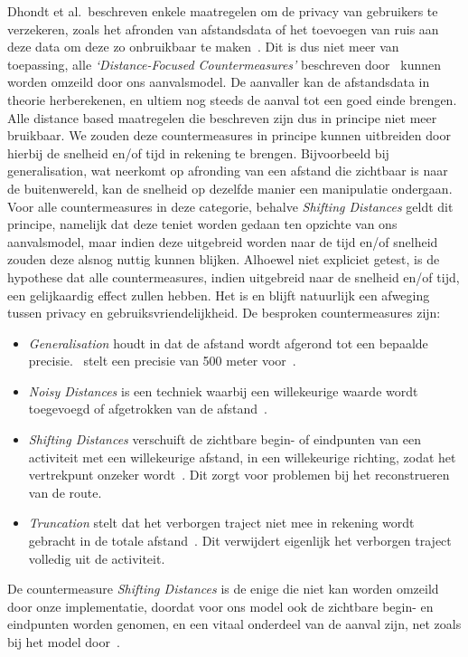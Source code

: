 Dhondt et al.\ beschreven enkele maatregelen om de privacy van gebruikers te
verzekeren, zoals het afronden van afstandsdata of het toevoegen van ruis aan
deze data om deze zo onbruikbaar te maken~\cite{Dhondt}. Dit is dus niet meer
van toepassing, alle \textit{`Distance-Focused Countermeasures'} beschreven
door~\citeauthor{Dhondt} kunnen worden omzeild door ons aanvalsmodel. De
aanvaller kan de afstandsdata in theorie herberekenen, en ultiem nog steeds de
aanval tot een goed einde brengen. Alle distance based maatregelen die
\citeauthor{Dhondt} beschreven zijn dus in principe niet meer bruikbaar. We
zouden deze countermeasures in principe kunnen uitbreiden door hierbij de
snelheid en/of tijd in rekening te brengen. Bijvoorbeeld bij generalisation,
wat neerkomt op afronding van een afstand die zichtbaar is naar de
buitenwereld, kan de snelheid op dezelfde manier een manipulatie ondergaan.
Voor alle countermeasures in deze categorie, behalve \textit{Shifting
      Distances} geldt dit principe, namelijk dat deze teniet worden gedaan ten
opzichte van ons aanvalsmodel, maar indien deze uitgebreid worden naar de tijd
en/of snelheid zouden deze alsnog nuttig kunnen blijken. Alhoewel niet
expliciet getest, is de hypothese dat alle countermeasures, indien uitgebreid
naar de snelheid en/of tijd, een gelijkaardig effect zullen hebben. Het is en
blijft natuurlijk een afweging tussen privacy en gebruiksvriendelijkheid. De
besproken countermeasures zijn:
\begin{itemize}
      \item \textit{Generalisation} houdt in dat de afstand wordt afgerond tot een bepaalde
            precisie.~\citeauthor{Dhondt} stelt een precisie van 500 meter
            voor~\cite{Dhondt}.
      \item \textit{Noisy Distances} is een techniek waarbij een willekeurige waarde wordt
            toegevoegd of afgetrokken van de afstand~\cite{Dhondt}.
      \item \textit{Shifting Distances} verschuift de zichtbare begin- of eindpunten van een activiteit met een willekeurige afstand, in een willekeurige richting,
            zodat het vertrekpunt onzeker wordt~\cite{Dhondt}. Dit zorgt voor problemen bij het reconstrueren van de route.
      \item \textit{Truncation} stelt dat het verborgen traject niet mee in rekening wordt gebracht in de
            totale afstand~\cite{Dhondt}. Dit verwijdert eigenlijk het verborgen traject volledig uit de activiteit.
\end{itemize}
De countermeasure \textit{Shifting Distances} is de enige die niet kan worden
omzeild door onze implementatie, doordat voor ons model ook de
zichtbare begin- en eindpunten worden genomen, en een vitaal onderdeel van de
aanval zijn, net zoals bij het model door~\citeauthor{Dhondt}.

